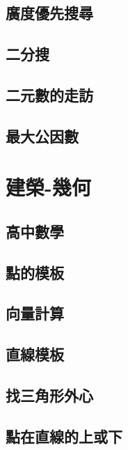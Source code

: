 \subsection{廣度優先搜尋}
\raggedbottom
\hrulefill
\subsection{二分搜}
\raggedbottom
\hrulefill
\subsection{二元數的走訪}
\raggedbottom
\hrulefill
\subsection{最大公因數}
\raggedbottom
\hrulefill

\section{建榮-幾何}
\subsection{高中數學}
\raggedbottom
\hrulefill
\subsection{點的模板}
\raggedbottom
\hrulefill
\subsection{向量計算}
\raggedbottom
\hrulefill
\subsection{直線模板}
\raggedbottom
\hrulefill
\subsection{找三角形外心}
\raggedbottom
\hrulefill
\subsection{點在直線的上或下}
\raggedbottom
\hrulefill
